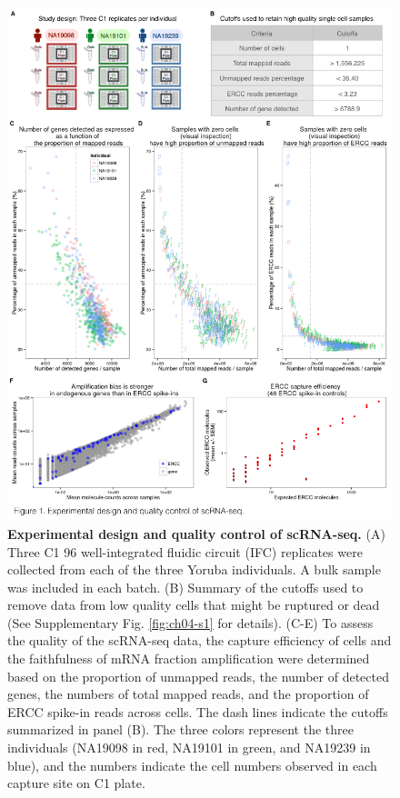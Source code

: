 \begin{figure}
\centering \includegraphics[trim=0 .5in 0
  0,clip,width=5in]{img/ch04/Figure01.jpeg}
\caption[Experimental design and quality control of
  scRNA-seq.]{\textbf{Experimental design and quality control of
    scRNA-seq.} (A) Three C1 96 well-integrated fluidic circuit (IFC)
  replicates were collected from each of the three Yoruba
  individuals. A bulk sample was included in each batch. (B) Summary
  of the cutoffs used to remove data from low quality cells that might
  be ruptured or dead (See Supplementary Fig. \ref{fig:ch04-s1} for
  details). (C-E) To assess the quality of the scRNA-seq data, the
  capture efficiency of cells and the faithfulness of mRNA fraction
  amplification were determined based on the proportion of unmapped
  reads, the number of detected genes, the numbers of total mapped
  reads, and the proportion of ERCC spike-in reads across cells.  The
  dash lines indicate the cutoffs summarized in panel (B). The three
  colors represent the three individuals (NA19098 in red, NA19101 in
  green, and NA19239 in blue), and the numbers indicate the cell
  numbers observed in each capture site on C1 plate.}
\label{fig:ch04-study-design}
\end{figure}

